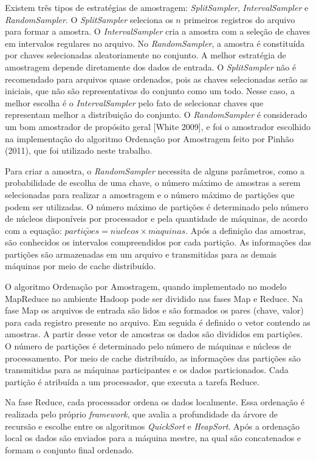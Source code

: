 Existem três tipos de estratégias de amostragem: \textit{SplitSampler}, \textit{IntervalSampler} e \textit{RandomSampler}. O \textit{SplitSampler} seleciona os $n$ primeiros registros do arquivo para formar a amostra. O \textit{IntervalSampler} cria a amostra com a seleção de chaves em intervalos regulares no arquivo. No \textit{RandomSampler}, a amostra é constituída por chaves selecionadas aleatoriamente no conjunto. A melhor estratégia de amostragem depende diretamente dos dados de entrada. O \textit{SplitSampler} não é recomendado para arquivos quase ordenados, pois as chaves selecionadas serão as iniciais, que não são representativas do conjunto como um todo. Nesse caso, a melhor escolha é o \textit{IntervalSampler} pelo fato de selecionar chaves que representam melhor a distribuição do conjunto. O \textit{RandomSampler} é considerado um bom amostrador de propósito geral [White 2009], e foi o amostrador escolhido na implementação do algoritmo Ordenação por Amostragem feito por Pinhão (2011), que foi utilizado neste trabalho.

Para criar a amostra, o \textit{RandomSampler} necessita de alguns parâmetros, como a probabilidade de escolha de uma chave, o número máximo de amostras a serem selecionadas para realizar a amostragem e o número máximo de partições que podem ser utilizadas.
O número máximo de partições é determinado pelo número de núcleos disponíveis por processador e pela quantidade de máquinas, de acordo com a equação: \mbox{$ parti \text{\c{c}} \tilde{o}es = n\acute{u}cleos \times m\acute{a}quinas$}.
Após a definição das amostras, são conhecidos os intervalos compreendidos por cada partição. As informações das partições são armazenadas em um arquivo e transmitidas para as demais máquinas por meio de cache distribuído.

O algoritmo Ordenação por Amostragem, quando implementado no modelo MapReduce no ambiente Hadoop pode ser dividido nas fases Map e Reduce.
Na fase Map os arquivos de entrada são lidos e são formados os pares (chave, valor) para cada registro presente no arquivo. 
Em seguida é definido o vetor contendo as amostras. A partir desse vetor de amostras os dados são divididos em partições. O número de partições é determinado pelo número de máquinas e núcleos de processamento. 
Por meio de cache distribuído, as informações das partições são transmitidas para as máquinas participantes e os dados particionados. Cada partição é atribuída a um processador, que executa a tarefa Reduce.

Na fase Reduce, cada processador ordena os dados localmente. Essa ordenação é realizada pelo próprio \textit{framework}, que avalia a profundidade da árvore de recursão e escolhe entre os  algoritmos \textit{QuickSort} e \textit{HeapSort}. 
Após a ordenação local os dados são enviados para a máquina mestre, na qual são concatenados e formam o conjunto final ordenado.

